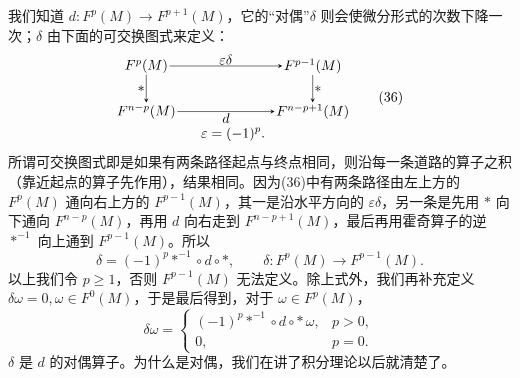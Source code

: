 我们知道 $d:F^p(M)\to F^{p+1}(M)$，它的“对偶”$\delta$ 则会使微分形式的次数下降一次；$\delta$ 由下面的可交换图式来定义：
\begin{equation}
\begin{gathered}
\begin{tikzpicture}[baseline=(current bounding box.center),>=stealth,
  every node/.style={inner sep=1pt}]
  \node (a) at (0,1.15) {$F^p(M)$};
  \node (b) at (4.2,1.15) {$F^{p-1}(M)$};
  \node (c) at (0,0) {$F^{n-p}(M)$};
  \node (d) at (4.2,0) {$F^{n-p+1}(M)$};
  \draw[->] (a)--node[above] {$\varepsilon\delta$} (b);
  \draw[->] (a)--node[left] {$*$} (c);
  \draw[->] (b)--node[right] {$*$} (d);
  \draw[->] (c)--node[below] {$d$} (d);
\end{tikzpicture}\\[-1mm]
\varepsilon=(-1)^p.
\end{gathered}
\tag{36}
\end{equation}
所谓可交换图式即是如果有两条路径起点与终点相同，则沿每一条道路的算子之积（靠近起点的算子先作用），结果相同。因为(36)中有两条路径由左上方的 $F^p(M)$ 通向右上方的 $F^{p-1}(M)$，其一是沿水平方向的 $\varepsilon\delta$，另一条是先用 $*$ 向下通向 $F^{n-p}(M)$，再用 $d$ 向右走到 $F^{n-p+1}(M)$，最后再用霍奇算子的逆 $*^{-1}$ 向上通到 $F^{p-1}(M)$。所以
\[
 \delta=(-1)^p*^{-1}\circ d\circ *,
 \qquad \delta:F^p(M)\to F^{p-1}(M).
\]
以上我们令 $p\ge1$，否则 $F^{p-1}(M)$ 无法定义。除上式外，我们再补充定义 $\delta\omega=0,\omega\in F^0(M)$，于是最后得到，对于 $\omega\in F^p(M)$，
\begin{equation}
 \delta\omega=
 \begin{cases}
 (-1)^p*^{-1}\circ d\circ *\,\omega,&p>0,\\
 0,&p=0.
 \end{cases}
 \tag{37}
\end{equation}
$\delta$ 是 $d$ 的对偶算子。为什么是对偶，我们在讲了积分理论以后就清楚了。

